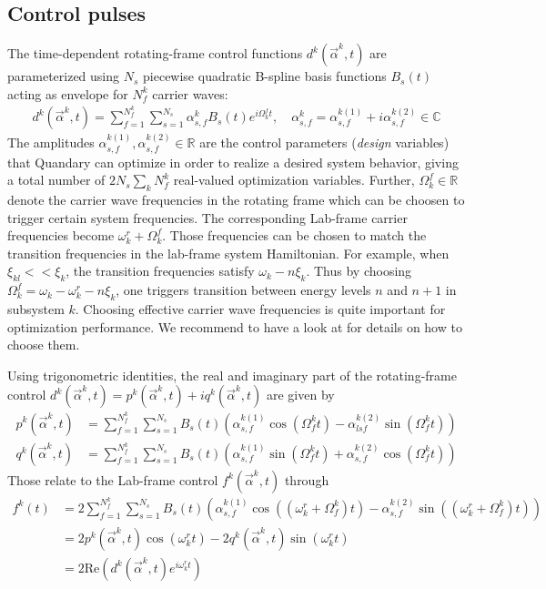 \documentclass[11pt]{article}
\newcommand{\R}{\mathds{R}}
\newcommand{\C}{\mathds{C}}
\begin{document}
\subsection{Control pulses} \label{subsec:controlpulses}
The time-dependent rotating-frame control functions $d^k(\vec{\alpha}^k,t)$ are parameterized using $N_s$ piecewise quadratic B-spline basis functions $B_s(t)$ acting as envelope for $N_f^k$ carrier waves:
\begin{align}
  d^k(\vec{\alpha}^k,t) = \sum_{f=1}^{N_f^k} \sum_{s=1}^{N_s} \alpha_{s,f}^k B_s(t) e^{i\Omega_k^ft}, \quad \alpha_{s,f}^k = \alpha_{s,f}^{k(1)} + i \alpha_{s,f}^{k(2)} \in \C
\end{align}
The amplitudes $\alpha_{s,f}^{k(1)}, \alpha_{s,f}^{k(2)} \in \R$ are the control
parameters (\textit{design} variables) that Quandary can optimize in order to realize a
desired system behavior, giving a total number of $2N_s\sum_kN_f^k$ real-valued optimization variables. Further, $\Omega_k^f \in \R$ denote the carrier wave frequencies in the rotating frame which can be choosen to trigger certain system frequencies. The corresponding Lab-frame carrier frequencies become $\omega_k^r + \Omega_k^f$. Those frequencies can be chosen to match the transition frequencies in the lab-frame system Hamiltonian. For example, when $\xi_{kl} << \xi_k$, the transition frequencies satisfy $\omega_k - n\xi_k$. Thus by choosing $\Omega_k^f = \omega_k-\omega_k^r - n \xi_k$, one triggers transition between energy levels $n$ and $n+1$ in subsystem $k$. Choosing effective carrier wave frequencies is quite important for optimization performance. We recommend to have a look at \cite{petersson2021optimal} for details on how to choose them.

Using trigonometric identities, the real and imaginary part of the rotating-frame control $d^k(\vec{\alpha}^k,t) = p^k(\vec{\alpha}^k,t) + iq^k(\vec{\alpha}^k,t)$ are given by
\begin{align}
  p^k(\vec{\alpha}^k,t) &= \sum_{f=1}^{N_f^k} \sum_{s=1}^{N_s} B_s(t)
  \left(\alpha^{k
  (1)}_{s,f} \cos(\Omega_f^k t) - \alpha^{k (2)}_{lsf} \sin(\Omega_f^k t)
  \right) \\
  q^k(\vec{\alpha}^k,t) &= \sum_{f=1}^{N_f^k} \sum_{s=1}^{N_s} B_s(t)\left( \alpha^{k
  (1)}_{s,f} \sin(\Omega_f^k t) + \alpha^{k (2)}_{s,f} \cos(\Omega_f^k t)
  \right)
\end{align}
Those relate to the Lab-frame control $f^k(\vec{\alpha}^k,t)$ through
\begin{align}
  f^k(t) &=  2\sum_{f=1}^{N_f^k} \sum_{s=1}^{N_s} B_s(t) \left(\alpha_{s,f}^{k(1)} \cos((\omega_k^{r} + \Omega_f^k) t) - \alpha_{s,f}^{k(2)}\sin((\omega_k^{r} + \Omega_f^k) t) \right) \\
         &= 2 p^k(\vec{\alpha}^k, t) \cos(\omega_k^{r} t) - 2 q^k(\vec{\alpha}^k,
         t)\sin(\omega_k^{r} t) \\
         &= 2\mbox{Re}\left( d^k(\vec{\alpha}^k,t)e^{i\omega_k^r t} \right)
\end{align}
\end{document}
